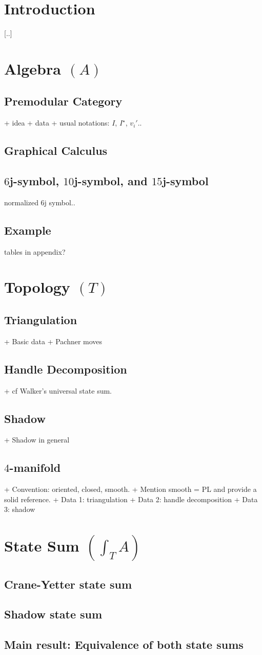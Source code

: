 \section{Introduction}

[..]

\section{Algebra $(A)$}
\subsection{Premodular Category}
+ idea
+ data
+ usual notations: $I$, $I^{\star}$, $v_{i}'$..
\subsection{Graphical Calculus}
\subsection{$6$j-symbol, $10$j-symbol, and $15$j-symbol}
normalized $6$j symbol..
\subsection{Example}
tables in appendix?

\section{Topology $(T)$}
\subsection{Triangulation}
+ Basic data
+ Pachner moves
\subsection{Handle Decomposition}
+ cf Walker's universal state sum.
\subsection{Shadow}
+ Shadow in general
\subsection{$4$-manifold}
+ Convention: oriented, closed, smooth.
+ Mention smooth = PL and provide a solid reference.
+ Data 1: triangulation
+ Data 2: handle decomposition
+ Data 3: shadow

\section{State Sum $\left( \int_{T}{A} \right)$}
\subsection{Crane-Yetter state sum}
\subsection{Shadow state sum}
\subsection{Main result: Equivalence of both state sums}
